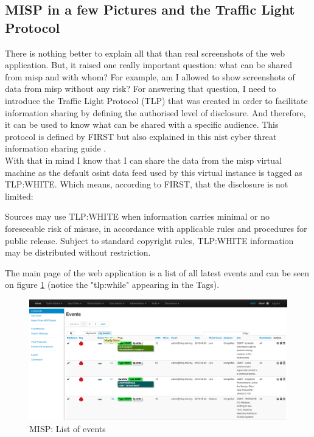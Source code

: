 \documentclass{eplmastersthesis}
\begin{document}
\subsection{MISP in a few Pictures and the Traffic Light Protocol}
There is nothing better to explain all that than real screenshots of the web application. But, it raised one really important question: what can be shared from \gls{misp} and with whom?
For example, am I allowed to show screenshots of data from \gls{misp} without any risk?
For answering that question, I need to introduce the Traffic Light Protocol (TLP) that was created in order to facilitate information sharing by defining the authorised level of disclosure. And therefore, it can be used to know what can be shared with a specific audience.
This protocol is defined by FIRST \cite{FirstTLP} but also explained in this \gls{nist} cyber threat information sharing guide \cite{johnson2016guide}.\\

With that in mind I know that I can share the data from the \gls{misp} virtual machine as the default \gls{osint} data feed used by this virtual instance is tagged as TLP:WHITE. Which means, according to FIRST, that the disclosure is not limited: \\

\begin{boxedverbatim}
	Sources may use TLP:WHITE when information carries minimal or no foreseeable 
	risk of misuse, in accordance with applicable rules and procedures for public 
	release. Subject to standard copyright rules, TLP:WHITE information may be 
	distributed without restriction.
\end{boxedverbatim}

The main page of the web application is a list of all latest events and can be seen on figure \ref{webevents} (notice the "tlp:while" appearing in the Tags).

\begin{figure}[!h]
	\begin{center}
		\includegraphics[scale=0.32]{res/webEvents}
		\caption{MISP: List of events}
		\label{webevents}
	\end{center}
\end{figure}
\end{document}
